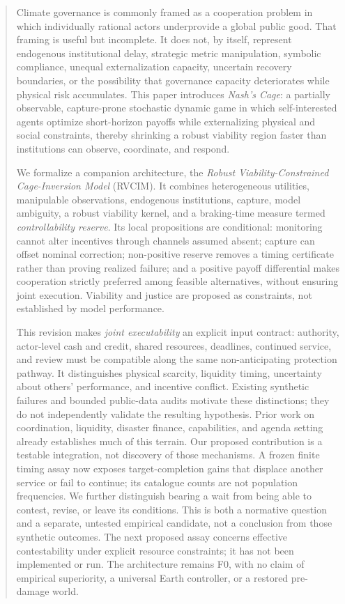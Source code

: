 \documentclass[11pt,a4paper]{article}
\numberwithin{equation}{section}
\theoremstyle{definition}
\theoremstyle{plain}
\theoremstyle{remark}
\newcommand{\RVCIM}{\textsc{RVCIM}}
\begin{document}
\begin{abstract}
Climate governance is commonly framed as a cooperation problem in which individually rational actors underprovide a global public good. That framing is useful but incomplete. It does not, by itself, represent endogenous institutional delay, strategic metric manipulation, symbolic compliance, unequal externalization capacity, uncertain recovery boundaries, or the possibility that governance capacity deteriorates while physical risk accumulates. This paper introduces \emph{Nash's Cage}: a partially observable, capture-prone stochastic dynamic game in which self-interested agents optimize short-horizon payoffs while externalizing physical and social constraints, thereby shrinking a robust viability region faster than institutions can observe, coordinate, and respond.

We formalize a companion architecture, the \emph{Robust Viability-Constrained Cage-Inversion Model} (\RVCIM). It combines heterogeneous utilities, manipulable observations, endogenous institutions, capture, model ambiguity, a robust viability kernel, and a braking-time measure termed \emph{controllability reserve}. Its local propositions are conditional: monitoring cannot alter incentives through channels assumed absent; capture can offset nominal correction; non-positive reserve removes a timing certificate rather than proving realized failure; and a positive payoff differential makes cooperation strictly preferred among feasible alternatives, without ensuring joint execution. Viability and justice are proposed as constraints, not established by model performance.

This revision makes \emph{joint executability} an explicit input contract: authority, actor-level cash and credit, shared resources, deadlines, continued service, and review must be compatible along the same non-anticipating protection pathway. It distinguishes physical scarcity, liquidity timing, uncertainty about others' performance, and incentive conflict. Existing synthetic failures and bounded public-data audits motivate these distinctions; they do not independently validate the resulting hypothesis. Prior work on coordination, liquidity, disaster finance, capabilities, and agenda setting already establishes much of this terrain. Our proposed contribution is a testable integration, not discovery of those mechanisms. A frozen finite timing assay now exposes target-completion gains that displace another service or fail to continue; its catalogue counts are not population frequencies. We further distinguish bearing a wait from being able to contest, revise, or leave its conditions. This is both a normative question and a separate, untested empirical candidate, not a conclusion from those synthetic outcomes. The next proposed assay concerns effective contestability under explicit resource constraints; it has not been implemented or run. The architecture remains F0, with no claim of empirical superiority, a universal Earth controller, or a restored pre-damage world.
\end{abstract}
\end{document}
